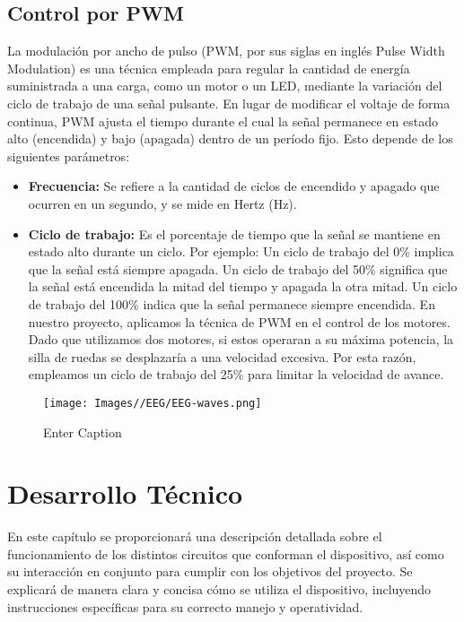 \documentclass{article}
\begin{document}
\subsection{Control por PWM}
La modulación por ancho de pulso (PWM, por sus siglas en inglés Pulse Width Modulation) es una técnica empleada para regular la cantidad de energía suministrada a una carga, como un motor o un LED, mediante la variación del ciclo de trabajo de una señal pulsante. En lugar de modificar el voltaje de forma continua, PWM ajusta el tiempo durante el cual la señal permanece en estado alto (encendida) y bajo (apagada) dentro de un período fijo. Esto depende de los siguientes parámetros:

\begin{itemize}
    \item \textbf{Frecuencia:} Se refiere a la cantidad de ciclos de encendido y apagado que ocurren en un segundo, y se mide en Hertz (Hz).
    \item \textbf{Ciclo de trabajo:} Es el porcentaje de tiempo que la señal se mantiene en estado alto durante un ciclo. Por ejemplo:
    Un ciclo de trabajo del 0\% implica que la señal está siempre apagada.
    Un ciclo de trabajo del 50\% significa que la señal está encendida la mitad del tiempo y apagada la otra mitad.
    Un ciclo de trabajo del 100\% indica que la señal permanece siempre encendida.
    En nuestro proyecto, aplicamos la técnica de PWM en el control de los motores. Dado que utilizamos dos motores, si estos operaran a su máxima potencia, la silla de ruedas se desplazaría a una velocidad excesiva. Por esta razón, empleamos un ciclo de trabajo del 25\% para limitar la velocidad de avance.
\end{itemize}

\begin{figure}[H]
    \centering
    \texttt{[image: Images//EEG/EEG-waves.png]}
    \caption{Enter Caption}
    \label{fig:enter-label}
\end{figure}

\section{Desarrollo Técnico}
En este capítulo se proporcionará una descripción detallada sobre el funcionamiento de los distintos circuitos que conforman el dispositivo, así como su interacción en conjunto para cumplir con los objetivos del proyecto. Se explicará de manera clara y concisa cómo se utiliza el dispositivo, incluyendo instrucciones específicas para su correcto manejo y operatividad.
\end{document}
